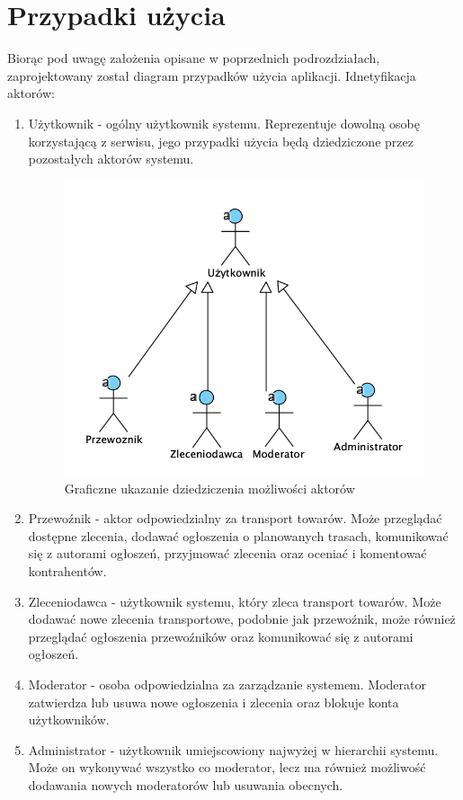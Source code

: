 \section{Przypadki użycia}
Biorąc pod uwagę założenia opisane w poprzednich podrozdziałach, zaprojektowany został diagram przypadków użycia aplikacji. Idnetyfikacja aktorów:
\begin{enumerate}
\item Użytkownik - ogólny użytkownik systemu. Reprezentuje dowolną osobę korzystającą z serwisu, jego przypadki użycia będą dziedziczone przez pozostałych aktorów systemu.
\begin{figure}[H]
	\centering
		\includegraphics[width=0.6\linewidth]{rozdzial1/dziedziczenie.png}
	\caption{Graficzne ukazanie dziedziczenia możliwości aktorów}
	\label{Rys. fig:Graficzne ukazanie dziedziczenia możliwości aktorów}
\end{figure}
\item Przewoźnik - aktor odpowiedzialny za transport towarów. Może przeglądać dostępne zlecenia, dodawać ogłoszenia o planowanych trasach, komunikować się z autorami ogłoszeń, przyjmować zlecenia oraz oceniać i komentować kontrahentów.
\item Zleceniodawca - użytkownik systemu, który zleca transport towarów. Może dodawać nowe zlecenia transportowe, podobnie jak przewoźnik, może również przeglądać ogłoszenia przewoźników oraz komunikować się z autorami ogłoszeń.
\item Moderator - osoba odpowiedzialna za zarządzanie systemem. Moderator zatwierdza lub usuwa nowe ogłoszenia i zlecenia oraz blokuje konta użytkowników.
\item Administrator - użytkownik umiejscowiony najwyżej w hierarchii systemu. Może on wykonywać wszystko co moderator, lecz ma również możliwość dodawania nowych moderatorów lub usuwania obecnych.
\end{enumerate}

